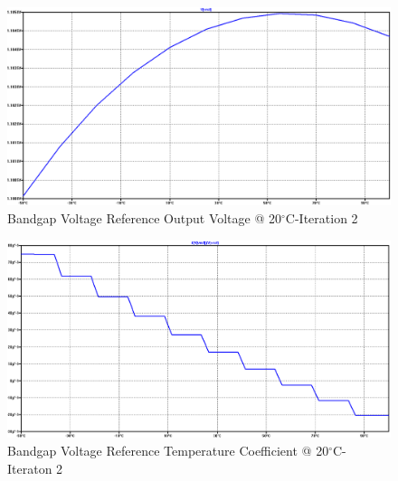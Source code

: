 \documentclass[conference]{IEEEtran}
\begin{document}
\begin{figure}[!htbp]
  	\centering
  	\includegraphics[scale=0.35]{images/appendix/bg2-vref.png}
  	\caption[output-z-meas]{Bandgap Voltage Reference Output Voltage @ 20$^{\circ}$C-Iteration 2}
  	\label{fig:bg1-vref}
	\end{figure}
\begin{figure}[!htbp]
  	\centering
  	\includegraphics[scale=0.35]{images/appendix/bg2-tempco.png}
  	\caption[output-z-meas]{Bandgap Voltage Reference Temperature Coefficient @ 20$^{\circ}$C-Iteraton 2}
  	\label{fig:bg1-tempco}
	\end{figure}




\end{document}
